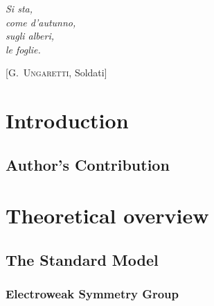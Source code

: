 \documentclass[10pt,twoside,cucitura,classica,english,openany]{toptesi}
\begin{document}

\english

\cleardoublepage

\frontespizio
\paginavuota
\begin{dedica}
\end{dedica}


\tablespagetrue\figurespagetrue \indici

\begin{citazioni}
  \textit{Si sta, \\
    come d'autunno, \\
    sugli alberi, \\
    le foglie.}

  [\textsc{G.~Ungaretti}, Soldati]
\end{citazioni}


\sommario



\mainmatter

\chapter{Introduction}
\label{cha:intro}



\section{Author's Contribution}
\label{sec:authors-contribution}



\chapter{Theoretical overview}
\label{cha:theoretical-overview}

\section{The Standard Model}
\label{sec:standard-model}



\subsection{Electroweak Symmetry Group}
\label{sec:electro-weak-symm}
\end{document}
